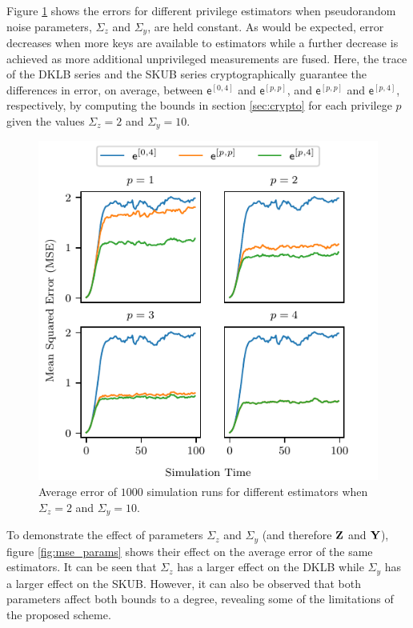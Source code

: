 \documentclass[conference]{IEEEtran}
\theoremstyle{definition}
\theoremstyle{remark}
\begin{document}
Figure \ref{fig:mse_privs} shows the errors for different privilege estimators when pseudorandom noise parameters, $\Sigma_z$ and $\Sigma_y$, are held constant. As would be expected, error decreases when more keys are available to estimators while a further decrease is achieved as more additional unprivileged measurements are fused. Here, the trace of the DKLB series and the SKUB series cryptographically guarantee the differences in error, on average, between $\mathsf{e}^{[0,4]}$ and $\mathsf{e}^{[p,p]}$, and $\mathsf{e}^{[p,p]}$ and $\mathsf{e}^{[p,4]}$, respectively, by computing the bounds in section \ref{sec:crypto} for each privilege $p$ given the values $\Sigma_z=2$ and $\Sigma_y=10$.
\begin{figure}[htbp]
  \centering
  \includegraphics{figures/mse_privs.pdf}
  \caption{Average error of $1000$ simulation runs for different estimators when $\Sigma_z=2$ and $\Sigma_y=10$.}
  \label{fig:mse_privs}
\end{figure}
To demonstrate the effect of parameters $\Sigma_z$ and $\Sigma_y$ (and therefore ${{\mathbf{Z}}}$ and ${{\mathbf{Y}}}$), figure \ref{fig:mse_params} shows their effect on the average error of the same estimators. It can be seen that $\Sigma_z$ has a larger effect on the DKLB while $\Sigma_y$ has a larger effect on the SKUB. However, it can also be observed that both parameters affect both bounds to a degree, revealing some of the limitations of the proposed scheme.
\end{document}
